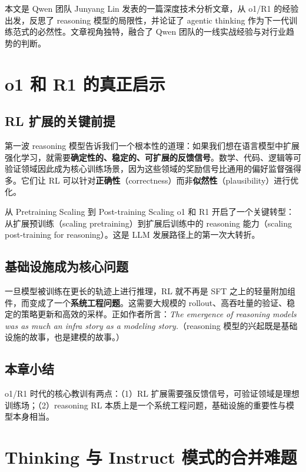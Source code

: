 \documentclass[a4paper]{article}
\begin{document}
本文是 Qwen 团队 Junyang Lin 发表的一篇深度技术分析文章，从 o1/R1 的经验出发，反思了 reasoning 模型的局限性，并论证了 agentic thinking 作为下一代训练范式的必然性。文章视角独特，融合了 Qwen 团队的一线实战经验与对行业趋势的判断。


\section{o1 和 R1 的真正启示}

\subsection{RL 扩展的关键前提}

第一波 reasoning 模型告诉我们一个根本性的道理：如果我们想在语言模型中扩展强化学习，就需要\textbf{确定性的、稳定的、可扩展的反馈信号}。数学、代码、逻辑等可验证领域因此成为核心训练场景，因为这些领域的奖励信号比通用的偏好监督强得多。它们让 RL 可以针对\textbf{正确性}（correctness）而非\textbf{似然性}（plausibility）进行优化。

\begin{knowledgebox}{从 Pretraining Scaling 到 Post-training Scaling}
o1 和 R1 开启了一个关键转型：从扩展预训练（scaling pretraining）到扩展后训练中的 reasoning 能力（scaling post-training for reasoning）。这是 LLM 发展路径上的第一次大转折。
\end{knowledgebox}

\subsection{基础设施成为核心问题}

一旦模型被训练在更长的轨迹上进行推理，RL 就不再是 SFT 之上的轻量附加组件，而变成了一个\textbf{系统工程问题}。这需要大规模的 rollout、高吞吐量的验证、稳定的策略更新和高效的采样。正如作者所言：\textit{The emergence of reasoning models was as much an infra story as a modeling story.}（reasoning 模型的兴起既是基础设施的故事，也是建模的故事。）

\subsection{本章小结}

o1/R1 时代的核心教训有两点：（1）RL 扩展需要强反馈信号，可验证领域是理想训练场；（2）reasoning RL 本质上是一个系统工程问题，基础设施的重要性与模型本身相当。


\section{Thinking 与 Instruct 模式的合并难题}
\end{document}
